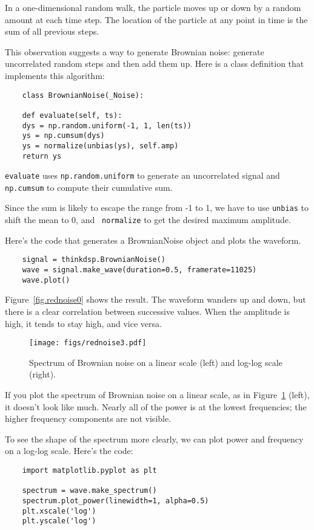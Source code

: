 In a one-dimensional random walk, the particle moves up or down
by a random amount at each time step.  The location of the particle
at any point in time is the sum of all previous steps.

This observation suggests a way to generate Brownian noise:
generate uncorrelated random steps and then add them up.
Here is a class definition that implements this algorithm:

\begin{verbatim}
	class BrownianNoise(_Noise):
	
	def evaluate(self, ts):
	dys = np.random.uniform(-1, 1, len(ts))
	ys = np.cumsum(dys)
	ys = normalize(unbias(ys), self.amp)
	return ys
\end{verbatim}

{\tt evaluate} uses {\tt np.random.uniform} to generate an
uncorrelated signal and {\tt np.cumsum} to compute their cumulative
sum.

Since the sum is likely to escape the range from -1 to
1, we have to use {\tt unbias} to shift the mean to 0, and {\tt
	normalize} to get the desired maximum amplitude.

Here's the code that generates a BrownianNoise object and plots the
waveform.

\begin{verbatim}
	signal = thinkdsp.BrownianNoise()
	wave = signal.make_wave(duration=0.5, framerate=11025)
	wave.plot()
\end{verbatim}

Figure~\ref{fig.rednoise0} shows the result.  The waveform
wanders up and down, but there is a clear correlation between
successive values.  When the amplitude is high, it tends to stay
high, and vice versa.

\begin{figure}
	\centerline{\texttt{[image: figs/rednoise3.pdf]}}
	\caption{Spectrum of Brownian noise on a linear scale (left) and
		log-log scale (right).}
	\label{fig.rednoise3}
\end{figure}

If you plot the spectrum of Brownian noise on a linear scale, as
in Figure~\ref{fig.rednoise3} (left), it
doesn't look like much.  Nearly all of the power is at the lowest
frequencies; the higher frequency components are not visible.

To see the shape of the spectrum more clearly, we can plot power
and frequency on a log-log scale.  Here's the code:

\begin{verbatim}
	import matplotlib.pyplot as plt
	
	spectrum = wave.make_spectrum()
	spectrum.plot_power(linewidth=1, alpha=0.5)
	plt.xscale('log')
	plt.yscale('log')
\end{verbatim}


